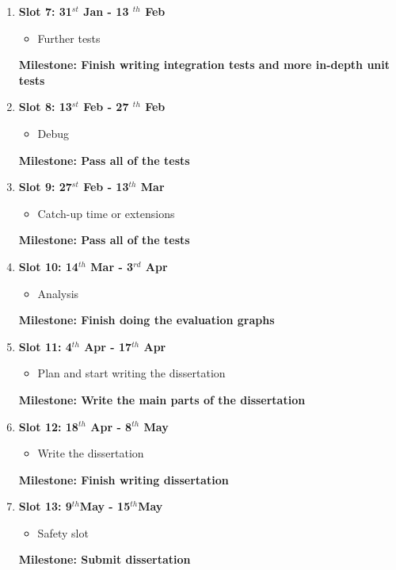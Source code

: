 \begin{enumerate}
	\begin{itemize}
		\item Buffer time: catch up or start doing the extensions
		\item Write progress report
	\end{itemize}
	{\bf Milestone: Submit progress report} 
\item {\bf Slot 7: 31$^{st}$ Jan - 13 $^{th}$ Feb}
	\begin{itemize}
		\item Further tests
	\end{itemize}
	{\bf Milestone: Finish writing integration tests and more in-depth unit tests} 
\item {\bf Slot 8: 13$^{st}$ Feb - 27 $^{th}$ Feb}
	\begin{itemize}
		\item Debug
	\end{itemize}
	{\bf Milestone: Pass all of the tests}
\item {\bf Slot 9: 27$^{st}$ Feb - 13$^{th}$ Mar}
	\begin{itemize}
		\item Catch-up time or extensions
	\end{itemize}
	{\bf Milestone: Pass all of the tests} 
\item {\bf Slot 10: 14$^{th}$ Mar - 3$^{rd}$ Apr}
	\begin{itemize}
		\item Analysis
	\end{itemize}
	{\bf Milestone: Finish doing the evaluation graphs} 
\item {\bf Slot 11: 4$^{th}$ Apr - 17$^{th}$ Apr}
	\begin{itemize}
		\item Plan and start writing the dissertation
	\end{itemize}
	{\bf Milestone: Write the main parts of the dissertation}
\item {\bf Slot 12: 18$^{th}$ Apr - 8$^{th}$ May}
	\begin{itemize}
		\item Write the dissertation
	\end{itemize}
	{\bf Milestone: Finish writing dissertation}	 
\item {\bf Slot 13: 9$^{th}$May  - 15$^{th}$May}
	\begin{itemize}
		\item Safety slot
	\end{itemize}
	{\bf Milestone: Submit dissertation} 
\end{enumerate}



 

